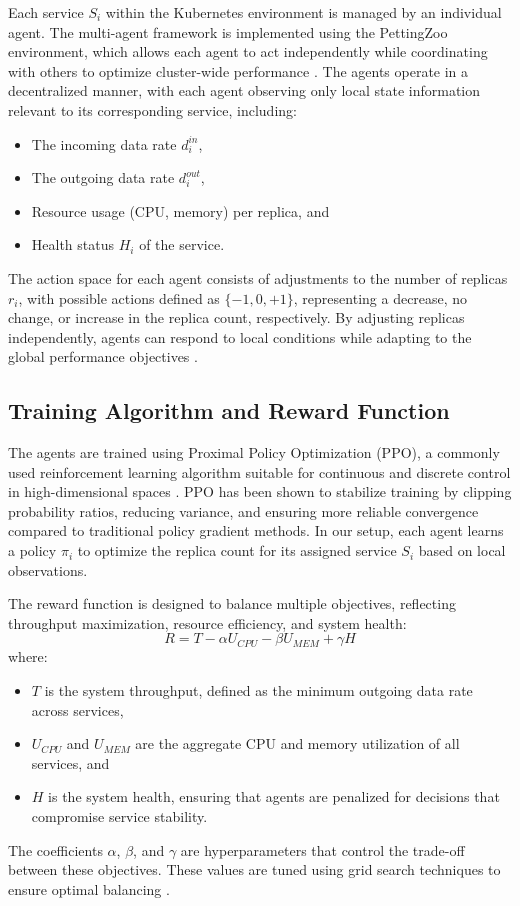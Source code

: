\documentclass[conference]{IEEEtran}
\begin{document}
Each service $S_i$ within the Kubernetes environment is managed by an individual agent. The multi-agent framework is implemented using the PettingZoo environment, which allows each agent to act independently while coordinating with others to optimize cluster-wide performance \cite{pettingzoo_framework}. The agents operate in a decentralized manner, with each agent observing only local state information relevant to its corresponding service, including:
\begin{itemize}
    \item The incoming data rate $\mathit{d_i^{in}}$,
    \item The outgoing data rate $\mathit{d_i^{out}}$,
    \item Resource usage (CPU, memory) per replica, and
    \item Health status $\mathit{H_i}$ of the service.
\end{itemize}

The action space for each agent consists of adjustments to the number of replicas $\mathit{r_i}$, with possible actions defined as $\{-1, 0, +1\}$, representing a decrease, no change, or increase in the replica count, respectively. By adjusting replicas independently, agents can respond to local conditions while adapting to the global performance objectives \cite{zhang_marl_k8s}.

\subsection{Training Algorithm and Reward Function}

The agents are trained using Proximal Policy Optimization (PPO), a commonly used reinforcement learning algorithm suitable for continuous and discrete control in high-dimensional spaces \cite{schulman_ppo}. PPO has been shown to stabilize training by clipping probability ratios, reducing variance, and ensuring more reliable convergence compared to traditional policy gradient methods. In our setup, each agent learns a policy $\pi_i$ to optimize the replica count for its assigned service $S_i$ based on local observations.

The reward function is designed to balance multiple objectives, reflecting throughput maximization, resource efficiency, and system health:
\begin{equation}
    R = T - \alpha U_{CPU} - \beta U_{MEM} + \gamma H
\end{equation}
where:
\begin{itemize}
    \item $T$ is the system throughput, defined as the minimum outgoing data rate across services,
    \item $U_{CPU}$ and $U_{MEM}$ are the aggregate CPU and memory utilization of all services, and
    \item $H$ is the system health, ensuring that agents are penalized for decisions that compromise service stability.
\end{itemize}
The coefficients $\alpha$, $\beta$, and $\gamma$ are hyperparameters that control the trade-off between these objectives. These values are tuned using grid search techniques to ensure optimal balancing \cite{wu_multi_objective_rl}.
\end{document}
